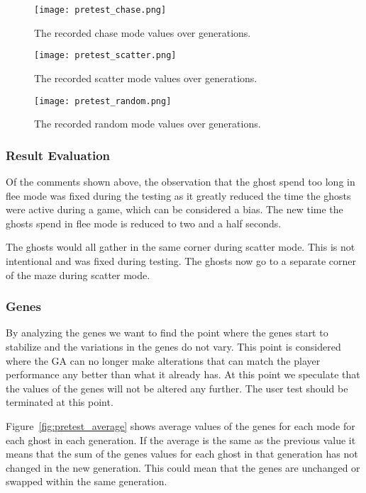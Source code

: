 \begin{figure}[!htbp]
	\centering
	\texttt{[image: pretest\_chase.png]}
	\caption{The recorded chase mode values over generations.}
	\label{fig:pretest_chase}
\end{figure}

\begin{figure}[!htbp]
	\centering
	\texttt{[image: pretest\_scatter.png]}
	\caption{The recorded scatter mode values over generations.}
	\label{fig:pretest_scatter}
\end{figure}

\begin{figure}[!htbp]
	\centering
	\texttt{[image: pretest\_random.png]}
	\caption{The recorded random mode values over generations.}
	\label{fig:pretest_random}
\end{figure}

\subsubsection{Result Evaluation}
Of the comments shown above, the observation that the ghost spend too long in flee mode was fixed during the testing as it greatly reduced the time the ghosts were active during a game, which can be considered a bias.
The new time the ghosts spend in flee mode is reduced to two and a half seconds.

The ghosts would all gather in the same corner during scatter mode.
This is not intentional and was fixed during testing.
The ghosts now go to a separate corner of the maze during scatter mode.

\subsubsection*{Genes}
By analyzing the genes we want to find the point where the genes start to stabilize and the variations in the genes do not vary.
This point is considered where the GA can no longer make alterations that can match the player performance any better than what it already has.
At this point we speculate that the values of the genes will not be altered any further.
The user test should be terminated at this point.

Figure~\ref{fig:pretest_average} shows average values of the genes for each mode for each ghost in each generation.
If the average is the same as the previous value it means that the sum of the genes values for each ghost in that generation has not changed in the new generation.
This could mean that the genes are unchanged or swapped within the same generation.

